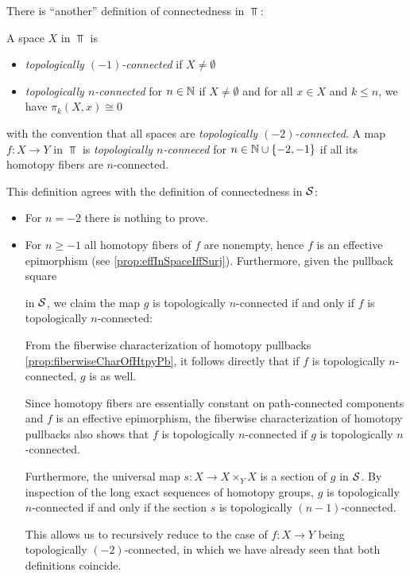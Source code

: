 \begin{remark}
    There is ``another'' definition of connectedness in $\Top$:

    A space $X$ in $\Top$ is 
    \begin{itemize}
        \item \emph{topologically $(-1)$-connected} if $X\neq\emptyset$
        \item \emph{topologically $n$-connected} for $n\in\mathbb{N}$ if $X\neq\emptyset$ and for all $x\in X$ and $k\leq n$, we have $\pi_k(X,x)\cong 0$
    \end{itemize}
    with the convention that all spaces are \emph{topologically $(-2)$-connected}.
    A map $f\colon X\to Y$ in $\Top$ is \emph{topologically $n$-conneced} for $n\in\mathbb{N}\cup\left\lbrace-2,-1\right\rbrace$ if all its homotopy fibers are $n$-connected. 

    This definition agrees with the definition of connectedness in $\mathcal{S}$:
    \begin{itemize}
        \item For $n=-2$ there is nothing to prove.
        \item For $n\geq -1$ all homotopy fibers of $f$ are nonempty, hence $f$ is an effective epimorphism (see \cref{prop:effInSpaceIffSurj}).
            Furthermore, given the pullback square
            \begin{center}
            \end{center}
            in $\mathcal{S}$, we claim the map $g$ is topologically $n$-connected if and only if $f$ is topologically $n$-connected:
            
            From the fiberwise characterization of homotopy pullbacks \cref{prop:fiberwiseCharOfHtpyPb}, it follows directly that if $f$ is topologically $n$-connected, $g$ is as well.

            Since homotopy fibers are essentially constant on path-connected components and $f$ is an effective epimorphism, the fiberwise characterization of homotopy pullbacks also shows that $f$ is topologically $n$-connected if $g$ is topologically $n$-connected.

            Furthermore, the universal map $s\colon X\to X\times_{Y} X$ is a section of $g$ in $\mathcal{S}$.
            By inspection of the long exact sequences of homotopy groups, $g$ is topologically $n$-connected if and only if the section $s$ is topologically $(n-1)$-connected.

            This allows us to recursively reduce to the case of $f\colon X\to Y$ being topologically $(-2)$-connected, in which we have already seen that both definitions coincide.
    \end{itemize}
\end{remark}
